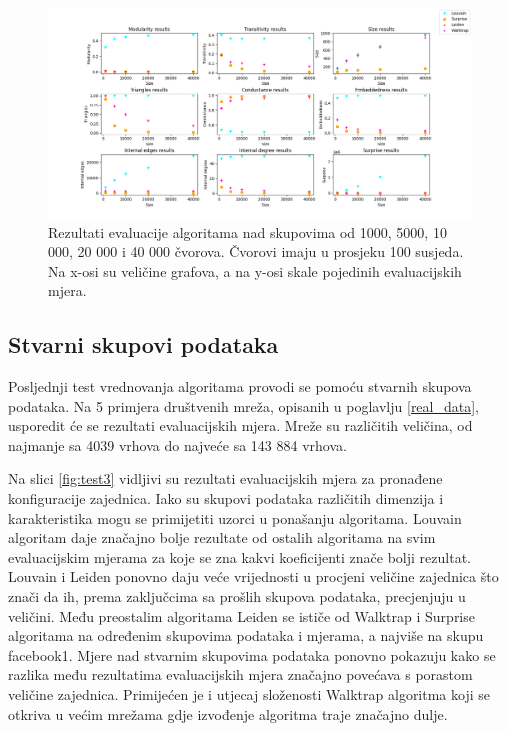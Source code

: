 \begin{figure}
	\includegraphics[width=\linewidth]{images/test2_100.png}
	\caption{Rezultati evaluacije algoritama nad skupovima od 1000, 5000, 10 000, 20 000 i 40 000 čvorova. Čvorovi imaju u prosjeku 100 susjeda. Na x-osi su veličine grafova, a na y-osi skale pojedinih evaluacijskih mjera.}
	\label{fig:test2_100}
\end{figure}


\subsection{Stvarni skupovi podataka}

Posljednji test vrednovanja algoritama provodi se pomoću stvarnih skupova podataka. Na 5 primjera društvenih mreža, opisanih u poglavlju \ref{real_data}, usporedit će se rezultati evaluacijskih mjera. Mreže su različitih veličina, od najmanje sa 4039 vrhova do najveće sa 143 884 vrhova.

Na slici \ref{fig:test3} vidljivi su rezultati evaluacijskih mjera za pronađene konfiguracije zajednica. Iako su skupovi podataka različitih dimenzija i karakteristika mogu se primijetiti uzorci u ponašanju algoritama. Louvain algoritam daje značajno bolje rezultate od ostalih algoritama na svim evaluacijskim mjerama za koje se zna kakvi koeficijenti znače bolji rezultat. Louvain i Leiden ponovno daju veće vrijednosti u procjeni veličine zajednica što znači da ih, prema zaključcima sa prošlih skupova podataka, precjenjuju u veličini. Među preostalim algoritama Leiden se ističe od Walktrap i Surprise algoritama na određenim skupovima podataka i mjerama, a najviše na skupu facebook1. Mjere nad stvarnim skupovima podataka ponovno pokazuju kako se razlika među rezultatima evaluacijskih mjera značajno povećava s porastom veličine zajednica. Primijećen je i utjecaj složenosti Walktrap algoritma koji se otkriva u većim mrežama gdje izvođenje algoritma traje značajno dulje.


